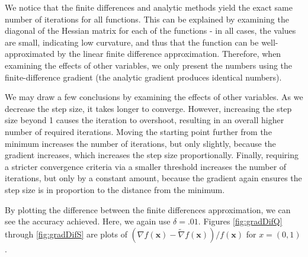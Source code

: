 \documentclass[10pt,letterpaper]{article}
\begin{document}
We notice that the finite differences and analytic methods yield the exact same number of iterations for all functions. This can be explained by examining the diagonal of the Hessian matrix for each of the functions - in all cases, the values are small, indicating low curvature, and thus that the function can be well-approximated by the linear finite difference approximation. Therefore, when examining the effects of other variables, we only present the numbers using the finite-difference gradient (the analytic gradient produces identical numbers).

We may draw a few conclusions by examining the effects of other variables. As we decrease the step size, it takes longer to converge. However, increasing the step size beyond 1 causes the iteration to overshoot, resulting in an overall higher number of required iterations. Moving the starting point further from the minimum increases the number of iterations, but only slightly, because the gradient increases, which increases the step size proportionally. Finally, requiring a stricter convergence criteria via a smaller threshold increases the number of iterations, but only by a constant amount, because the gradient again ensures the step size is in proportion to the distance from the minimum.

By plotting the difference between the finite differences approximation, we can see the accuracy achieved. Here, we again use $\delta = .01$. Figures \ref{fig:gradDifQ} through \ref{fig:gradDifS} are plots of $(\nabla f(\mathbf{x}) - \tilde{\nabla} f(\mathbf{x}))/f(\mathbf{x})$ for $x=(0,1)$.
\end{document}
